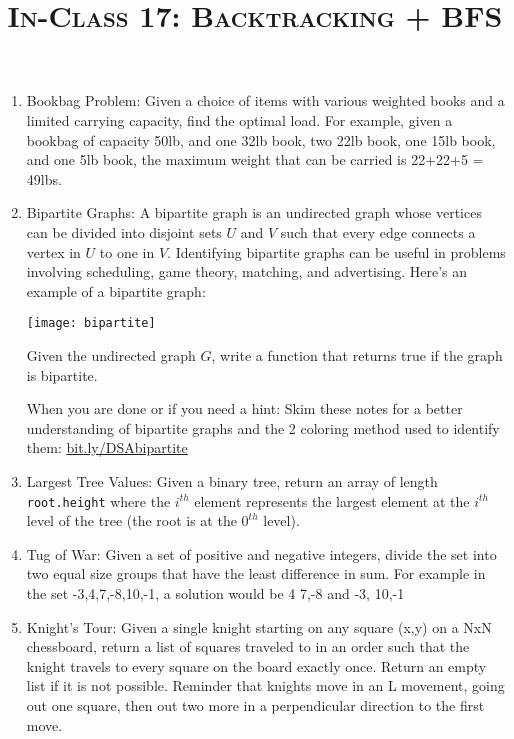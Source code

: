 \documentclass{article}
\title{\large{\textsc{In-Class 17: Backtracking + BFS}}}
\date{}
\begin{document}
\maketitle

\subsection*{}


\begin{enumerate}

\item  Bookbag Problem: Given a choice of items with
various weighted books and a limited carrying capacity, 
find the optimal load. For example, given a bookbag of capacity 50lb, and one 32lb book, two 22lb book, one 15lb book, and one 5lb book, the maximum weight that can be carried is 22+22+5 = 49lbs.

\item Bipartite Graphs: A bipartite graph is an undirected graph whose vertices can be divided into disjoint sets $U$ and $V$ such that every edge connects a vertex in $U$ to one in $V$.  Identifying bipartite graphs can be useful in problems involving scheduling, game theory, matching, and advertising. Here's an example of a bipartite graph:

\centerline{\texttt{[image: bipartite]}}

Given the undirected graph $G$, write a function that returns true if the graph is bipartite.

When you are done or if you need a hint: Skim these notes for a better understanding of bipartite graphs and the 2 coloring method used to identify them: \href{bit.ly/DSAbipartite}{bit.ly/DSAbipartite}

\item Largest Tree Values: Given a binary tree, return an array of length \texttt{root.height} where the $i^{th}$ element represents the largest element at the $i^{th}$ level of the tree (the root is at the $0^{th}$ level).

\item Tug of War: Given a set of positive and negative integers, divide the set into two equal size groups that have the least difference in sum. For example in the set {-3,4,7,-8,10,-1}, a solution would be {4 7,-8} and { -3, 10,-1}

\item Knight's Tour: Given a single knight starting on any square (x,y) on a NxN chessboard, return a list of squares traveled to in an order such that the knight travels to every square on the board exactly once. Return an empty list if it is not possible. Reminder that knights move in an L movement, going out one square, then out two more in a perpendicular direction to the first move.


\end{enumerate}
\end{document}
